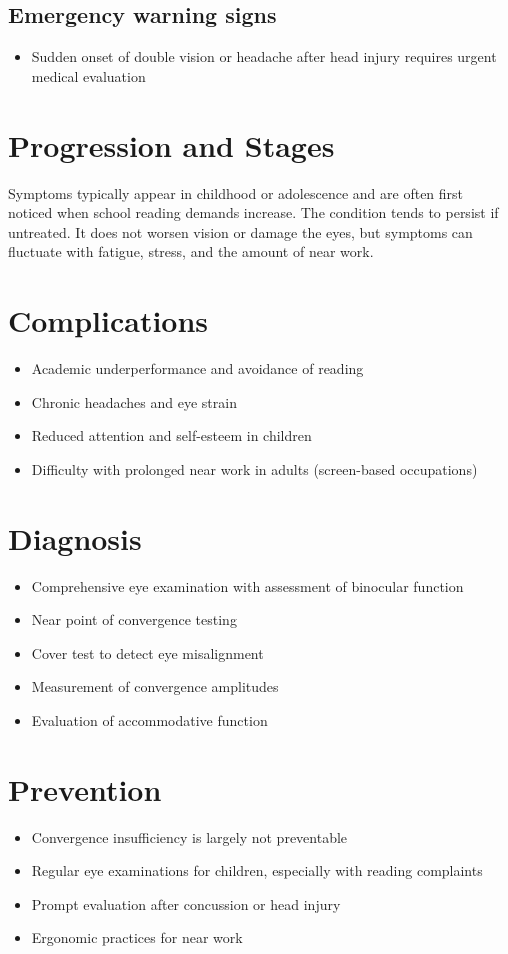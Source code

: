 \subsection{Emergency warning signs}
\begin{itemize}[noitemsep]
  \item Sudden onset of double vision or headache after head injury requires urgent medical evaluation
\end{itemize}
\section{Progression and Stages}
Symptoms typically appear in childhood or adolescence and are often first noticed when school reading demands increase. The condition tends to persist if untreated. It does not worsen vision or damage the eyes, but symptoms can fluctuate with fatigue, stress, and the amount of near work.
\section{Complications}
\begin{itemize}[noitemsep]
  \item Academic underperformance and avoidance of reading
  \item Chronic headaches and eye strain
  \item Reduced attention and self-esteem in children
  \item Difficulty with prolonged near work in adults (screen-based occupations)
\end{itemize}
\section{Diagnosis}
\begin{itemize}[noitemsep]
  \item Comprehensive eye examination with assessment of binocular function
  \item Near point of convergence testing
  \item Cover test to detect eye misalignment
  \item Measurement of convergence amplitudes
  \item Evaluation of accommodative function
\end{itemize}
\section{Prevention}
\begin{itemize}[noitemsep]
  \item Convergence insufficiency is largely not preventable
  \item Regular eye examinations for children, especially with reading complaints
  \item Prompt evaluation after concussion or head injury
  \item Ergonomic practices for near work
\end{itemize}
